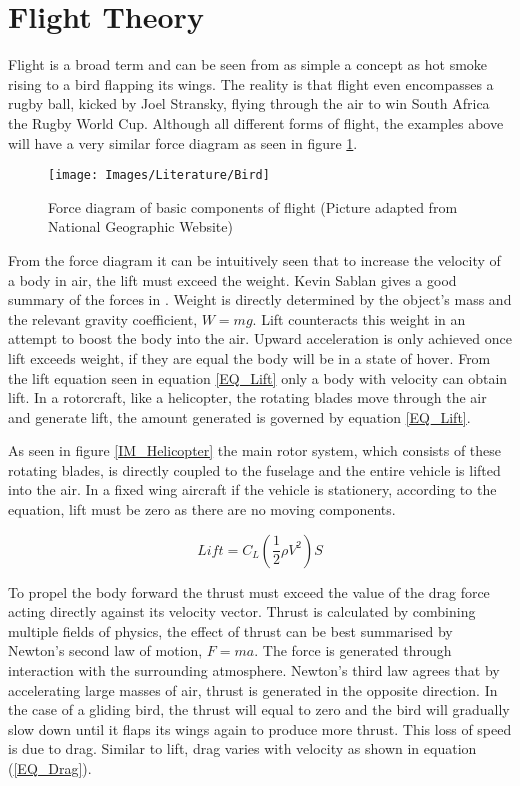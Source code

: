 	

\section{Flight Theory}

Flight is a broad term and can be seen from as simple a concept as hot smoke rising to a bird flapping its wings. The reality is that flight even encompasses a rugby ball, kicked by Joel Stransky, flying through the air to win South Africa the Rugby World Cup. Although all different forms of flight, the examples above will have a very similar force diagram as seen in figure \ref{IM_FlightForces}.

\begin{figure}
\centering
\texttt{[image: Images/Literature/Bird]}
\caption{Force diagram of basic components of flight (Picture adapted from National Geographic Website)}
\label{IM_FlightForces}
\end{figure}

From the force diagram it can be intuitively seen that to increase the velocity of a body in air, the lift must exceed the weight. Kevin Sablan gives a good summary of the forces in \cite{TheoryofFlight}.
Weight is directly determined by the object's mass and the relevant gravity coefficient, $W = mg$. Lift counteracts this weight in an attempt to boost the body into the air. Upward acceleration is only achieved once lift exceeds weight, if they are equal the body will be in a state of hover. From the lift equation seen in equation \ref{EQ_Lift} only a body with velocity can obtain lift. In a rotorcraft, like a helicopter, the rotating blades move through the air and generate lift, the amount generated is governed by equation \ref{EQ_Lift}. 

As seen in figure \ref{IM_Helicopter} the main rotor system, which consists of these rotating blades, is directly coupled to the fuselage and the entire vehicle is lifted into the air. In a fixed wing aircraft if the vehicle is stationery, according to the equation, lift must be zero as there are no moving components. 

\begin{equation}
\label{EQ_Lift}
Lift = C_L(\frac{1}{2} \rho V^2) S
\end{equation}

To propel the body forward the thrust must exceed the value of the drag force acting directly against its velocity vector. Thrust is calculated by combining multiple fields of physics, the effect of thrust can be best summarised by Newton's second law of motion, $F=ma$. The force is generated through interaction with the surrounding atmosphere. Newton's third law agrees that by accelerating large masses of air, thrust is generated in the opposite direction. In the case of a gliding bird, the thrust will equal to zero and the bird will gradually slow down until it flaps its wings again to produce more thrust. This loss of speed is due to drag. Similar to lift, drag varies with velocity as shown in equation (\ref{EQ_Drag}).

